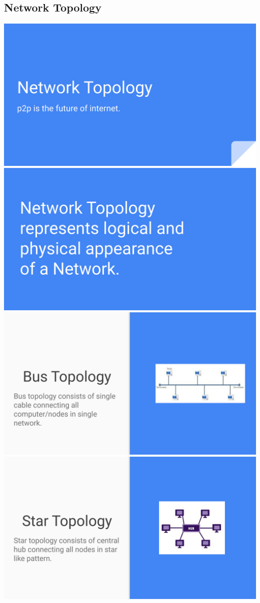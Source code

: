 \documentclass[17pt,a4paper,oneside,margin=1in]{article}
\begin{document}
\subsection{Network Topology}
\begin{center}
	\includegraphics[width=0.7\linewidth]{./scrot/network-0.png}
	\includegraphics[width=0.7\linewidth]{./scrot/network-1.png}
	\includegraphics[width=0.7\linewidth]{./scrot/network-2.png}
	\includegraphics[width=0.7\linewidth]{./scrot/network-3.png}
\end{center}
\end{document}
